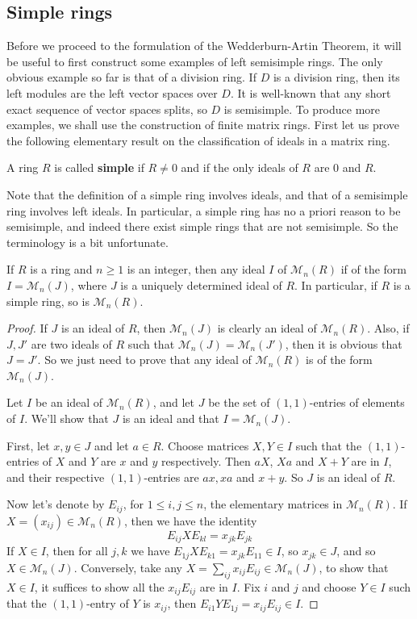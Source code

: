 \subsection{Simple rings}
Before we proceed to the formulation of the Wedderburn-Artin Theorem, it will be useful to first construct some examples of left semisimple rings.
The only obvious example so far is that of a division ring. If $D$ is a division ring, then its left modules are the left vector spaces over $D$. It is well-known that any short exact sequence of vector spaces splits, so $D$ is semisimple. To produce more examples, we shall use the construction of finite matrix rings. First let us prove the following elementary result on
the classification of ideals in a matrix ring.
\begin{definition}
A ring $R$ is called \textbf{simple} if $R\neq0$ and if the only ideals of $R$ are $0$ and $R$.
\end{definition}
\begin{remark}
Note that the definition of a simple ring involves ideals, and that of a semisimple ring involves left ideals. In particular, a simple ring has no a priori reason to be semisimple, and indeed there exist simple rings that are not semisimple. So the terminology is a bit unfortunate.
\end{remark}
\begin{proposition}
If $R$ is a ring and $n\geq1$ is an integer, then any ideal $I$ of $\mathcal{M}_n(R)$ if of the form $I=\mathcal{M}_n(J)$, where $J$ is a uniquely determined ideal of $R$. In particular, if $R$ is a simple ring, so is $\mathcal{M}_n(R)$.
\end{proposition}
\begin{proof}
If $J$ is an ideal of $R$, then $\mathcal{M}_n(J)$ is clearly an ideal of $\mathcal{M}_n(R)$. Also, if $J,J'$ are two ideals of $R$ such that $\mathcal{M}_n(J)=\mathcal{M}_n(J')$, then it is obvious that $J=J'$. So we just need to prove that any ideal of $\mathcal{M}_n(R)$ is of the form $\mathcal{M}_n(J)$.\par
Let $I$ be an ideal of $\mathcal{M}_n(R)$, and let $J$ be the set of $(1,1)$-entries of elements of $I$. We'll show that $J$ is an ideal and that $I=\mathcal{M}_n(J)$.\par
First, let $x,y\in J$ and let $a\in R$. Choose matrices $X,Y\in I$ such that the $(1,1)$-entries of $X$ and $Y$ are $x$ and $y$ respectively. Then $aX$, $Xa$ and $X+Y$ are in $I$, and their respective $(1,1)$-entries are $ax,xa$ and $x+y$. So $J$ is an ideal of $R$.\par
Now let's denote by $E_{ij}$, for $1\leq i,j\leq n$, the elementary matrices in $\mathcal{M}_n(R)$. If $X=(x_{ij})\in\mathcal{M}_n(R)$, then we have the identity
\[E_{ij}XE_{kl}=x_{jk}E_{jk}\]
If $X\in I$, then for all $j,k$ we have $E_{1j}XE_{k1}=x_{jk}E_{11}\in I$, so $x_{jk}\in J$, and so $X\in\mathcal{M}_n(J)$. Conversely, take any $X=\sum_{ij}x_{ij}E_{ij}\in\mathcal{M}_n(J)$, to show that $X\in I$, it suffices to show all the $x_{ij}E_{ij}$ are in $I$. Fix $i$ and $j$ and choose $Y\in I$ such that the $(1,1)$-entry of $Y$ is $x_{ij}$, then $E_{i1}YE_{1j}=x_{ij}E_{ij}\in I$.
\end{proof}

